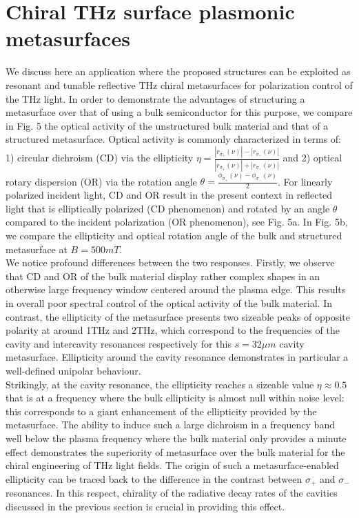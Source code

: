\documentclass[twocolumn]{article}
\begin{document}
\section*{Chiral THz surface plasmonic metasurfaces}
\noindent We discuss here an application where the proposed structures can be exploited as resonant and tunable reflective THz chiral metasurfaces for polarization control of the THz light. In order to demonstrate the advantages of structuring a metasurface over that of using a bulk semiconductor for this purpose, we compare in Fig. 5 the optical activity of the unstructured bulk material and that of a structured metasurface. Optical activity is commonly characterized in terms of: 1) circular dichroism (CD) via the ellipticity $\eta=\frac{|r_{\sigma_{+}}(\nu)|-|r_{\sigma_{-}}(\nu)|}{|r_{\sigma_{+}}(\nu)|+|r_{\sigma_{-}}(\nu)|}$ and 2) optical rotary dispersion (OR) via the rotation angle $\theta=\frac{\phi_{\sigma_{+}}(\nu)-\phi_{\sigma_{-}}(\nu)}{2}$\cite{Zhou_2012}.  For linearly polarized incident light, CD and OR result in the present context in reflected light that is elliptically polarized (CD phenomenon) and rotated by an angle $\theta$ compared to the incident polarization (OR phenomenon), see Fig. 5a.
In Fig. 5b, we compare the ellipticity and optical rotation angle of the bulk and structured metasurface at $B=500mT$.\\
\noindent We notice profound differences between the two responses. Firstly, we observe that CD and OR of the bulk material display rather complex shapes in an otherwise large frequency window centered around the plasma edge. This results in overall poor spectral control of the optical activity of the bulk material. In contrast, the ellipticity of the metasurface presents two sizeable peaks of opposite polarity at around 1THz and 2THz, which correspond to the frequencies of the cavity and intercavity resonances respectively for this $s=32 \mu m$ cavity metasurface. Ellipticity around the cavity resonance demonstrates in particular a well-defined unipolar behaviour.\\
Strikingly, at the cavity resonance, the ellipticity  reaches a sizeable value $\eta \approx 0.5$ that is at a frequency where the bulk ellipticity is almost null within noise level: this corresponds to a giant enhancement of the ellipticity provided by the metasurface. The ability to induce such a large dichroism in a frequency band well below the plasma frequency where the bulk material only provides a minute effect demonstrates the superiority of metasurface over the bulk material for the chiral engineering of THz light fields. The origin of such a metasurface-enabled ellipticity can be traced back to the difference in the contrast between  $\sigma_{+}$ and $\sigma_{-}$ resonances. In this respect, chirality of the radiative decay rates of the cavities discussed in the previous section is crucial in providing this effect. \\
\end{document}
